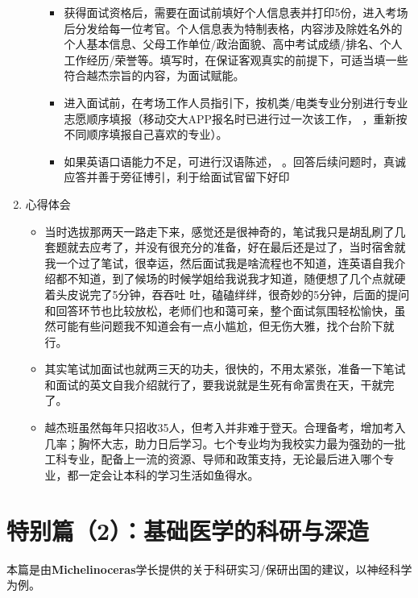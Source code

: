 \documentclass[zihao=-4,fontset=none]{Beautybook-CN}
\begin{document}
\begin{enumerate}
\begin{enumerate}
\begin{itemize}
	      	      	\item 获得面试资格后，需要在面试前填好个人信息表并打印5份，进入考场后分发给每一位考官。个人信息表为特制表格，内容涉及除姓名外的个人基本信息、父母工作单位/政治面貌、高中考试成绩/排名、个人工作经历/荣誉等。填写时，在保证客观真实的前提下，可适当填一些符合越杰宗旨的内容，为面试赋能。
	      	      	      
	      	      	\item 进入面试前，在考场工作人员指引下，按机类/电类专业分别进行专业志愿顺序填报（移动交大APP报名时已进行过一次该工作， ，重新按不同顺序填报自己喜欢的专业）。
	      	      	      
	      	      	\item 如果英语口语能力不足，可进行汉语陈述，  。回答后续问题时，真诚应答并善于旁征博引，利于给面试官留下好印
	      	      \end{itemize}
	      \end{enumerate}    
	      	      	      
	\item 心得体会 
	      \begin{itemize}
	      	\item 当时选拔那两天一路走下来，感觉还是很神奇的，笔试我只是胡乱刷了几套题就去应考了，并没有很充分的准备，好在最后还是过了，当时宿舍就我一个过了笔试，很幸运，然后面试我是啥流程也不知道，连英语自我介绍都不知道，到了候场的时候学姐给我说我才知道，随便想了几个点就硬着头皮说完了5分钟，吞吞吐 吐，磕磕绊绊，很奇妙的5分钟，后面的提问和回答环节也比较放松，老师们也和蔼可亲，整个面试氛围轻松愉快，虽然可能有些问题我不知道会有一点小尴尬，但无伤大雅，找个台阶下就行。
	      	      
	      	\item 其实笔试加面试也就两三天的功夫，很快的，不用太紧张，准备一下笔试和面试的英文自我介绍就行了，要我说就是生死有命富贵在天，干就完了。
	      	      
	      	\item 越杰班虽然每年只招收35人，但考入并非难于登天。合理备考，增加考入几率；胸怀大志，助力日后学习。七个专业均为我校实力最为强劲的一批工科专业，配备上一流的资源、导师和政策支持，无论最后进入哪个专业，都一定会让本科的学习生活如鱼得水。
	      \end{itemize}
\end{enumerate}
\chapter{特别篇（2）：基础医学的科研与深造}\label{sp2}
\begin{example}
    本篇是由\textbf{Michelinoceras}学长提供的关于科研实习/保研出国的建议，以神经科学为例。
\end{example}
\end{document}
